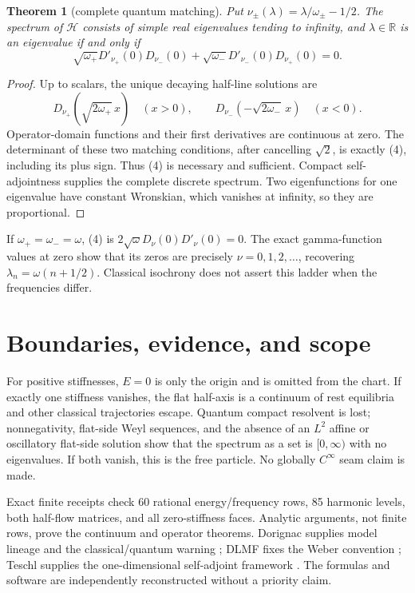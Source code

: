 \documentclass[10pt]{article}
\newtheorem{theorem}{Theorem}
\newcommand{\R}{\mathbb{R}}
\begin{document}
\begin{theorem}[complete quantum matching]\label{thm:quantum}
Put \(\nu_\pm(\lambda)=\lambda/\omega_\pm-1/2\). The spectrum of
\(\mathcal H\) consists of simple real eigenvalues tending to infinity, and
\(\lambda\in\R\) is an eigenvalue if and only if
\[
 \sqrt{\omega_+}D'_{\nu_+}(0)D_{\nu_-}(0)
 +\sqrt{\omega_-}D'_{\nu_-}(0)D_{\nu_+}(0)=0.                  \tag{4}
\]
\end{theorem}
\begin{proof}
Up to scalars, the unique decaying half-line solutions are
\[
 D_{\nu_+}(\sqrt{2\omega_+}\,x)\quad(x>0),\qquad
 D_{\nu_-}(-\sqrt{2\omega_-}\,x)\quad(x<0).
\]
Operator-domain functions and their first derivatives are continuous at zero.
The determinant of these two matching conditions, after cancelling
\(\sqrt2\), is exactly (4), including its plus sign. Thus (4) is necessary
and sufficient. Compact self-adjointness supplies the complete discrete
spectrum. Two eigenfunctions for one eigenvalue have constant Wronskian,
which vanishes at infinity, so they are proportional.
\end{proof}

If \(\omega_+=\omega_-=\omega\), (4) is
\(2\sqrt\omega D_\nu(0)D'_\nu(0)=0\). The exact gamma-function values at zero
show that its zeros are precisely \(\nu=0,1,2,\ldots\), recovering
\(\lambda_n=\omega(n+1/2)\). Classical isochrony does not assert this ladder
when the frequencies differ.

\section{Boundaries, evidence, and scope}
For positive stiffnesses, \(E=0\) is only the origin and is omitted from the
chart. If exactly one stiffness vanishes, the flat half-axis is a continuum
of rest equilibria and other classical trajectories escape. Quantum compact
resolvent is lost; nonnegativity, flat-side Weyl sequences, and the absence of
an \(L^2\) affine or oscillatory flat-side solution show that the spectrum as
a set is \([0,\infty)\) with no eigenvalues. If both vanish, this is the free
particle. No globally \(C^\infty\) seam claim is made.

Exact finite receipts check 60 rational energy/frequency rows, 85 harmonic
levels, both half-flow matrices, and all zero-stiffness faces. Analytic
arguments, not finite rows, prove the continuum and operator theorems.
Dorignac supplies model lineage and the classical/quantum warning
\cite{Dorignac}; DLMF fixes the Weber convention \cite{DLMF}; Teschl supplies
the one-dimensional self-adjoint framework \cite{Teschl}. The formulas and
software are independently reconstructed without a priority claim.
\end{document}
